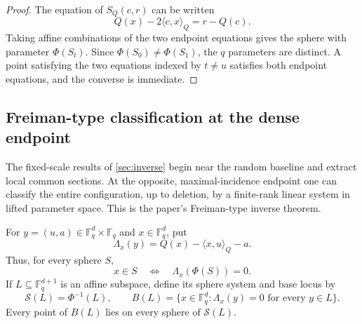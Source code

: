 \documentclass[11pt,letterpaper]{amsart}
\theoremstyle{definition}
\theoremstyle{remark}
\newcommand{\1}{\mathbf 1}
\newcommand{\ip}[2]{\langle #1,#2\rangle_Q}
\begin{document}
\begin{proof}
The equation of $S_Q(c,r)$ can be written
\[
 Q(x)-2\ip{c}{x}=r-Q(c).
\]
Taking affine combinations of the two endpoint equations gives the sphere with parameter $\Phi(S_t)$.  Since $\Phi(S_0)\ne\Phi(S_1)$, the $q$ parameters are distinct.  A point satisfying the two equations indexed by $t\ne u$ satisfies both endpoint equations, and the converse is immediate.
\end{proof}

\subsection{Freiman-type classification at the dense endpoint}\label{subsec:dense-freiman}

The fixed-scale results of \cref{sec:inverse} begin near the random baseline and extract local common sections.  At the opposite, maximal-incidence endpoint one can classify the entire configuration, up to deletion, by a finite-rank linear system in lifted parameter space.  This is the paper's Freiman-type inverse theorem.

For $y=(u,a)\in\mathbb F_q^d\times\mathbb F_q$ and $x\in\mathbb F_q^d$, put
\begin{equation}\label{eq:lambda-lift}
 \Lambda_x(y)=Q(x)-\ip{x}{u}-a.
\end{equation}
Thus, for every sphere $S$,
\begin{equation}\label{eq:lift-incidence-functional}
 x\in S\quad\Longleftrightarrow\quad \Lambda_x(\Phi(S))=0.
\end{equation}
If $L\subseteq\mathbb F_q^{d+1}$ is an affine subspace, define its sphere system and base locus by
\begin{equation}\label{eq:lift-linear-model}
 \mathcal S(L)=\Phi^{-1}(L),
 \qquad
 B(L)=\{x\in\mathbb F_q^d:\Lambda_x(y)=0\text{ for every }y\in L\}.
\end{equation}
Every point of $B(L)$ lies on every sphere of $\mathcal S(L)$.
\end{document}
